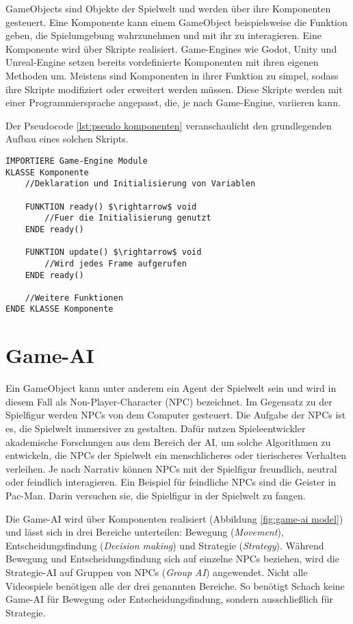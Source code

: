 GameObjects sind Objekte der Spielwelt und werden \"{u}ber ihre Komponenten gesteuert. Eine Komponente kann einem GameObject beispielsweise die Funktion geben, die Spielumgebung wahrzunehmen und mit ihr zu interagieren. Eine Komponente wird \"{u}ber Skripte realisiert. Game-Engines wie Godot, Unity und Unreal-Engine setzen bereits vordefinierte Komponenten mit ihren eigenen Methoden um. Meistens sind Komponenten in ihrer Funktion zu simpel, sodass ihre Skripte modifiziert oder erweitert werden m\"{u}ssen. Diese Skripte werden mit einer Programmiersprache angepasst, die, je nach Game-Engine, variieren kann.

Der Pseudocode \ref{lst:pseudo komponenten} veranschaulicht den grundlegenden Aufbau eines solchen Skripts.

\begin{lstlisting}[language=Pseudo, caption={Aufbau eines Komponenten Skripts}, mathescape=true, label={lst:pseudo komponenten}]
IMPORTIERE Game-Engine Module
KLASSE Komponente
	//Deklaration und Initialisierung von Variablen
	
	FUNKTION ready() $\rightarrow$ void
		//Fuer die Initialisierung genutzt
	ENDE ready()

	FUNKTION update() $\rightarrow$ void
		//Wird jedes Frame aufgerufen
	ENDE ready()
	
	//Weitere Funktionen
ENDE KLASSE Komponente

\end{lstlisting}

\section{Game-AI}
\label{chap:game-ai}

Ein GameObject kann unter anderem ein Agent der Spielwelt sein und wird in diesem Fall als Non-Player-Character (NPC) bezeichnet. Im Gegensatz zu der Spielfigur werden NPCs von dem Computer gesteuert. Die Aufgabe der NPCs ist es, die Spielwelt immersiver zu gestalten. Daf\"{u}r nutzen Spieleentwickler akademische Forschungen aus dem Bereich der AI, um solche Algorithmen zu entwickeln, die NPCs der Spielwelt ein menschlicheres oder tierischeres Verhalten verleihen. Je nach Narrativ k\"{o}nnen NPCs mit der Spielfigur freundlich, neutral oder feindlich interagieren. Ein Beispiel f\"{u}r feindliche NPCs sind die Geister in Pac-Man. Darin versuchen sie, die Spielfigur in der Spielwelt zu fangen.

Die Game-AI wird \"{u}ber Komponenten realisiert (Abbildung \ref{fig:game-ai model}) und l\"{a}sst sich in drei Bereiche unterteilen: Bewegung (\textit{Movement}), Entscheidungsfindung (\textit{Decision making}) und Strategie (\textit{Strategy}). W\"{a}hrend Bewegung und Entscheidungsfindung sich auf einzelne NPCs beziehen, wird die Strategie-AI auf Gruppen von NPCs (\textit{Group AI}) angewendet. Nicht alle Videospiele ben\"{o}tigen alle der drei genannten Bereiche. So ben\"{o}tigt Schach keine Game-AI f\"{u}r Bewegung oder Entscheidungsfindung, sondern ausschlie\ss{}lich f\"{u}r Strategie.

